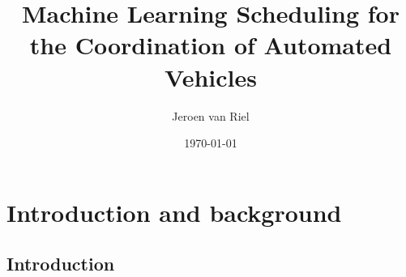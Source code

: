 \documentclass[a4paper]{report}
\author{Jeroen van Riel}
\date{\monthyeardate\today}
\title{%
  \huge Machine Learning Scheduling for the Coordination of Automated Vehicles
  }
\theoremstyle{definition}
\theoremstyle{plain}
\begin{document}







\chapter{Introduction and background}

\section{Introduction}
\end{document}
